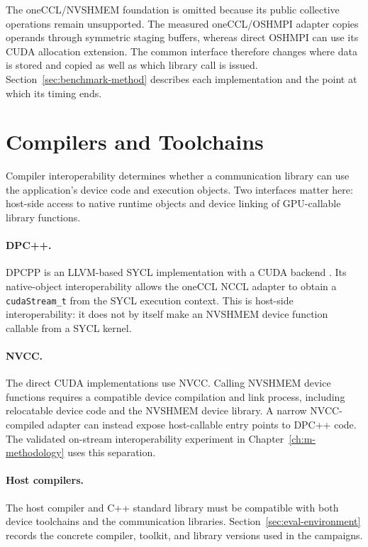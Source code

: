 The oneCCL/NVSHMEM foundation is omitted because its public collective operations remain unsupported. The measured oneCCL/OSHMPI adapter copies operands through symmetric staging buffers, whereas direct OSHMPI can use its CUDA allocation extension. The common interface therefore changes where data is stored and copied as well as which library call is issued. Section~\ref{sec:benchmark-method} describes each implementation and the point at which its timing ends.

\section{Compilers and Toolchains}

Compiler interoperability determines whether a communication library can use the application's device code and execution objects. Two interfaces matter here: host-side access to native runtime objects and device linking of GPU-callable library functions.

\paragraph{DPC++.}
\ac{DPCPP} is an LLVM-based SYCL implementation with a CUDA backend \cite{intel_llvm_sycl_63}. Its native-object interoperability allows the oneCCL NCCL adapter to obtain a \texttt{cudaStream\_t} from the SYCL execution context. This is host-side interoperability: it does not by itself make an NVSHMEM device function callable from a SYCL kernel.

\paragraph{NVCC.}
The direct CUDA implementations use \ac{NVCC}. Calling NVSHMEM device functions requires a compatible device compilation and link process, including relocatable device code and the NVSHMEM device library. A narrow NVCC-compiled adapter can instead expose host-callable entry points to DPC++ code. The validated on-stream interoperability experiment in Chapter~\ref{ch:m-methodology} uses this separation.

\paragraph{Host compilers.}
The host compiler and C++ standard library must be compatible with both device toolchains and the communication libraries. Section~\ref{sec:eval-environment} records the concrete compiler, toolkit, and library versions used in the campaigns.

